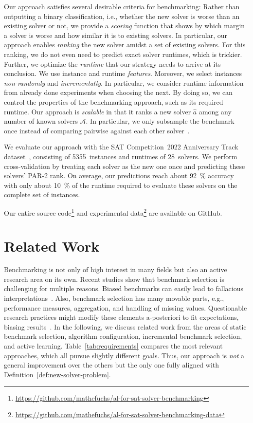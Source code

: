\documentclass[runningheads]{llncs}
\begin{document}
Our approach satisfies several desirable criteria for benchmarking:
Rather than outputting a binary classification, i.e., whether the new solver is worse than an existing solver or not, we provide a \emph{scoring} function that shows by which margin a solver is worse and how similar it is to existing solvers.
In particular, our approach enables \emph{ranking} the new solver amidst a set of existing solvers.
For this ranking, we do not even need to predict exact solver runtimes, which is trickier.
Further, we optimize the \emph{runtime} that our strategy needs to arrive at its conclusion.
We use instance and runtime \emph{features}.
Moreover, we select instances \emph{non-randomly} and \emph{incrementally}.
In particular, we consider runtime information from already done experiments when choosing the next.
By doing so, we can control the properties of the benchmarking approach, such as its required runtime.
Our approach is \emph{scalable} in that it ranks a new solver $\hat{a}$ among any number of known solvers $\mathcal{A}$.
In particular, we only subsample the benchmark once instead of comparing pairwise against each other solver~\cite{MatriconAFSH21}.

We evaluate our approach with the SAT Competition~2022 Anniversary Track dataset~\cite{sat2022}, consisting of 5355~instances and runtimes of 28~solvers.
We perform cross-validation by treating each solver as the new one once and predicting these solvers' PAR-2 rank.
On average, our predictions reach about \SI{92}{\%} accuracy with only about \SI{10}{\%} of the runtime required to evaluate these solvers on the complete set of instances.

Our entire source code\footnote{\url{https://github.com/mathefuchs/al-for-sat-solver-benchmarking}} and experimental data\footnote{\url{https://github.com/mathefuchs/al-for-sat-solver-benchmarking-data}} are available on GitHub.

\section{Related Work}

Benchmarking is not only of high interest in many fields but also an active research area on its own.
Recent studies show that benchmark selection is challenging for multiple reasons.
Biased benchmarks can easily lead to fallacious interpretations~\cite{abs-2107-07002}.
Also, benchmark selection has many movable parts, e.g., performance measures, aggregation, and handling of missing values.
Questionable research practices might modify these elements a-posteriori to fit expectations, biasing results~\cite{NiesslHWCB22}.
In the following, we discuss related work from the areas of static benchmark selection, algorithm configuration, incremental benchmark selection, and active learning.
Table~\ref{tab:requirements} compares the most relevant approaches, which all pursue slightly different goals.
Thus, our approach is \emph{not} a general improvement over the others but the only one fully aligned with Definition~\ref{def:new-solver-problem}.
\end{document}
